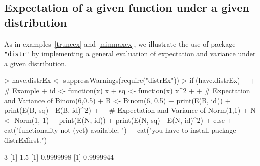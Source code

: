 \documentclass[11pt]{article}
\newcommand{\pkg}[1]{{\tt "#1"}}
\begin{document}
\subsection{Expectation of a given function under a given distribution}
\begin{small}
As in examples~\ref{truncex} and \ref{minmaxex}, we illustrate the use of
package {\tt "distr"} by implementing a general evaluation of expectation
and variance under a given distribution.
\end{small}
\begin{Schunk}
\begin{Sinput}
> have.distrEx <- suppressWarnings(require("distrEx"))
> if (have.distrEx)
+    {
+      # Example
+      id <- function(x) x
+      sq <- function(x) x^2
+
+      # Expectation and Variance of Binom(6,0.5)
+      B <- Binom(6, 0.5)
+      print(E(B, id))
+      print(E(B, sq) - E(B, id)^2)
+
+      # Expectation and Variance of Norm(1,1)
+      N <- Norm(1, 1)
+      print(E(N, id))
+      print(E(N, sq) - E(N, id)^2)
+    } else {
+     cat("\n functionality not (yet) available; ")
+     cat("you have to install package \"distrEx\" first.\n")
+    }
\end{Sinput}
\begin{Soutput}
[1] 3
[1] 1.5
[1] 0.9999998
[1] 0.9999944
\end{Soutput}
\end{Schunk}
\end{document}
